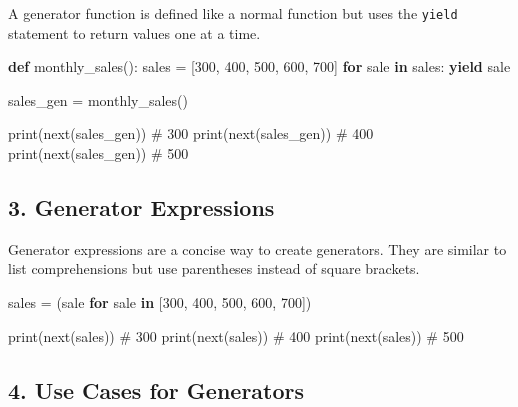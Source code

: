 \documentclass[
  letterpaper,
  DIV=11,
  numbers=noendperiod]{scrreprt}
\newenvironment{Shaded}{\begin{snugshade}}{\end{snugshade}}
\newcommand{\BuiltInTok}[1]{\textcolor[rgb]{0.00,0.23,0.31}{#1}}
\newcommand{\CommentTok}[1]{\textcolor[rgb]{0.37,0.37,0.37}{#1}}
\newcommand{\ControlFlowTok}[1]{\textcolor[rgb]{0.00,0.23,0.31}{\textbf{#1}}}
\newcommand{\DecValTok}[1]{\textcolor[rgb]{0.68,0.00,0.00}{#1}}
\newcommand{\KeywordTok}[1]{\textcolor[rgb]{0.00,0.23,0.31}{\textbf{#1}}}
\newcommand{\NormalTok}[1]{\textcolor[rgb]{0.00,0.23,0.31}{#1}}
\newcommand{\OperatorTok}[1]{\textcolor[rgb]{0.37,0.37,0.37}{#1}}
\begin{document}
A generator function is defined like a normal function but uses the
\texttt{yield} statement to return values one at a time.

\begin{Shaded}
\begin{Highlighting}[]
\KeywordTok{def}\NormalTok{ monthly\_sales():}
\NormalTok{    sales }\OperatorTok{=}\NormalTok{ [}\DecValTok{300}\NormalTok{, }\DecValTok{400}\NormalTok{, }\DecValTok{500}\NormalTok{, }\DecValTok{600}\NormalTok{, }\DecValTok{700}\NormalTok{]}
    \ControlFlowTok{for}\NormalTok{ sale }\KeywordTok{in}\NormalTok{ sales:}
        \ControlFlowTok{yield}\NormalTok{ sale}

\NormalTok{sales\_gen }\OperatorTok{=}\NormalTok{ monthly\_sales()}

\BuiltInTok{print}\NormalTok{(}\BuiltInTok{next}\NormalTok{(sales\_gen))  }\CommentTok{\# 300}
\BuiltInTok{print}\NormalTok{(}\BuiltInTok{next}\NormalTok{(sales\_gen))  }\CommentTok{\# 400}
\BuiltInTok{print}\NormalTok{(}\BuiltInTok{next}\NormalTok{(sales\_gen))  }\CommentTok{\# 500}
\end{Highlighting}
\end{Shaded}

\subsection{3. Generator Expressions}\label{generator-expressions}

Generator expressions are a concise way to create generators. They are
similar to list comprehensions but use parentheses instead of square
brackets.

\begin{Shaded}
\begin{Highlighting}[]
\NormalTok{sales }\OperatorTok{=}\NormalTok{ (sale }\ControlFlowTok{for}\NormalTok{ sale }\KeywordTok{in}\NormalTok{ [}\DecValTok{300}\NormalTok{, }\DecValTok{400}\NormalTok{, }\DecValTok{500}\NormalTok{, }\DecValTok{600}\NormalTok{, }\DecValTok{700}\NormalTok{])}

\BuiltInTok{print}\NormalTok{(}\BuiltInTok{next}\NormalTok{(sales))  }\CommentTok{\# 300}
\BuiltInTok{print}\NormalTok{(}\BuiltInTok{next}\NormalTok{(sales))  }\CommentTok{\# 400}
\BuiltInTok{print}\NormalTok{(}\BuiltInTok{next}\NormalTok{(sales))  }\CommentTok{\# 500}
\end{Highlighting}
\end{Shaded}

\subsection{4. Use Cases for Generators}\label{use-cases-for-generators}
\end{document}
